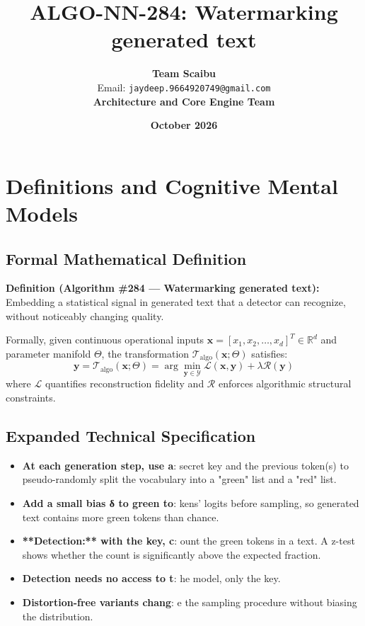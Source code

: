 \documentclass[11pt,a4paper]{article}
\title{\textbf{ALGO-NN-284: Watermarking generated text}}
\author{\textbf{Team Scaibu} \\ \small Email: \texttt{jaydeep.9664920749@gmail.com} \\ \small \textbf{Architecture and Core Engine Team}}
\date{\textbf{October 2026}}
\theoremstyle{definition}
\begin{document}
\maketitle

\section{Definitions and Cognitive Mental Models}

\subsection{Formal Mathematical Definition}
\textbf{Definition (Algorithm \#284 --- Watermarking generated text):}
Embedding a statistical signal in generated text that a detector can recognize, without noticeably changing quality.

Formally, given continuous operational inputs $\mathbf{x} = [x_1, x_2, \dots, x_d]^T \in \mathbb{R}^d$ and parameter manifold $\Theta$, the transformation $\mathcal{T}_{\text{algo}}(\mathbf{x}; \Theta)$ satisfies:
{\boldmath
\begin{equation}
\mathbf{y} = \mathcal{T}_{\text{algo}}(\mathbf{x}; \Theta) = \arg\min_{\mathbf{y} \in \mathcal{Y}} \mathcal{L}(\mathbf{x}, \mathbf{y}) + \lambda \mathcal{R}(\mathbf{y})
\end{equation}
}
where $\mathcal{L}$ quantifies reconstruction fidelity and $\mathcal{R}$ enforces algorithmic structural constraints.

\subsection{Expanded Technical Specification}
\begin{itemize}
\item \textbf{At each generation step, use a}:  secret key and the previous token(s) to pseudo-randomly split the vocabulary into a "green" list and a "red" list.
\item \textbf{Add a small bias δ to green to}: kens' logits before sampling, so generated text contains more green tokens than chance.
\item \textbf{**Detection:** with the key, c}: ount the green tokens in a text. A z-test shows whether the count is significantly above the expected fraction.
\item \textbf{Detection needs no access to t}: he model, only the key.
\item \textbf{Distortion-free variants chang}: e the sampling procedure without biasing the distribution.
\end{itemize}
\end{document}
